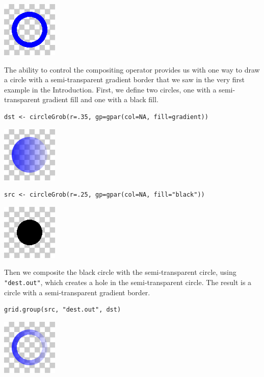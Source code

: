 \includegraphics{murrell-definitions-2023_files/figure-latex/unnamed-chunk-30-1.png}

The ability to control the compositing operator provides us with
one way to draw a circle with a semi-transparent gradient border
that we saw in the very first example in the Introduction.
First, we define two circles, one with a semi-transparent gradient fill
and one with a black fill.

\begin{verbatim}
dst <- circleGrob(r=.35, gp=gpar(col=NA, fill=gradient))
\end{verbatim}

\includegraphics{murrell-definitions-2023_files/figure-latex/unnamed-chunk-31-1.png}

\begin{verbatim}
src <- circleGrob(r=.25, gp=gpar(col=NA, fill="black"))
\end{verbatim}

\includegraphics{murrell-definitions-2023_files/figure-latex/unnamed-chunk-32-1.png}

Then we composite the black circle with the semi-transparent circle,
using \texttt{"dest.out"}, which creates a hole in the semi-transparent circle.
The result is a circle with a semi-transparent
gradient border.

\begin{verbatim}
grid.group(src, "dest.out", dst)
\end{verbatim}

\includegraphics{murrell-definitions-2023_files/figure-latex/unnamed-chunk-33-1.png}


